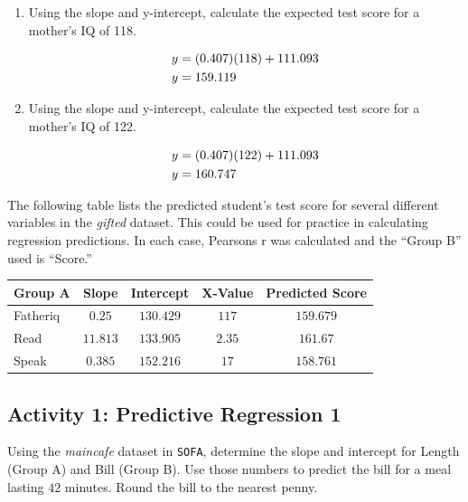 \begin{enumerate}
  \item Using the slope and y-intercept, calculate the expected test score for a mother's IQ of 118.

  \begin{align}
    \notag
    y &= (0.407)(118)+111.093 \\
    \notag
    y &= 159.119
  \end{align}

  \item Using the slope and y-intercept, calculate the expected test score for a mother's IQ of 122.

  \begin{align}
    \notag
    y &= (0.407)(122)+111.093 \\
    \notag
    y &= 160.747
  \end{align}

\end{enumerate}

The following table lists the predicted student's test score for several different variables in the \textit{gifted} dataset. This could be used for practice in calculating regression predictions. In each case, Pearsons r was calculated and the ``Group B'' used is ``Score.''

\begin{center}
  \begin{tabular}{lcccc}
    \hline 
    \textbf{Group A} & \textbf{Slope} & \textbf{Intercept} & \textbf{X-Value} & \textbf{Predicted Score} \\ 
    \hline 
    Fatheriq     & $ 0.25 $ & $ 130.429 $ & $ 117 $ & $ 159.679 $ \\ 
    Read      & $ 11.813 $ & $  133.905 $ & $ 2.35 $ & $ 161.67 $  \\ 
    Speak   & $ 0.385 $ & $ 152.216 $ & $ 17 $ & $ 158.761 $ \\ 
    \hline 
  \end{tabular} 
\end{center}

\subsection{Activity 1: Predictive Regression 1} \label{reg:act01}

Using the \textit{maincafe} dataset in \texttt{SOFA}, determine the slope and intercept for Length (Group A) and Bill (Group B). Use those numbers to predict the bill for a meal lasting $ 42 $ minutes. Round the bill to the nearest penny.

